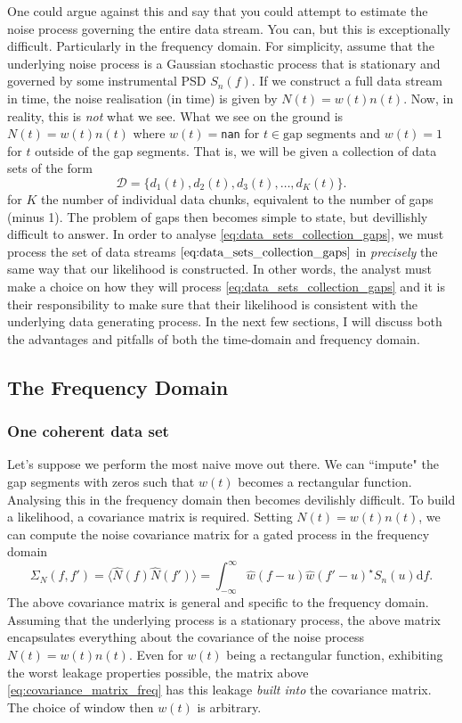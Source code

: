 \documentclass{article}
\begin{document}
One could argue against this and say that you could attempt to estimate the noise process governing the entire data stream. You can, but this is exceptionally difficult. Particularly in the frequency domain. For simplicity, assume that the underlying noise process is a Gaussian stochastic process that is stationary and governed by some instrumental PSD $S_{n}(f)$. If we construct a full data stream in time, the noise realisation (in time) is given by $N(t) = w(t)n(t)$. Now, in reality, this is \emph{not} what we see. What we see on the ground is $N(t) = w(t)n(t)$ where $w(t) =$\texttt{nan} for $t \in \text{gap segments}$ and $w(t) = 1$ for $t$ outside of the gap segments. That is, we will be given a collection of data sets of the form 
\begin{equation}\label{eq:data_sets_collection_gaps}
    \mathcal{D} = \{d_{1}(t), d_{2}(t), d_{3}(t), \ldots, d_{K}(t)\}.
\end{equation}
for $K$ the number of individual data chunks, equivalent to the number of gaps (minus 1). The problem of gaps then becomes simple to state, but devillishly difficult to answer. In order to analyse \eqref{eq:data_sets_collection_gaps}, we must process the set of data streams $\eqref{eq:data_sets_collection_gaps}$ in \emph{precisely} the same way that our likelihood is constructed. In other words, the analyst must make a choice on how they will process \eqref{eq:data_sets_collection_gaps} and it is their responsibility to make sure that their likelihood is consistent with the underlying data generating process. In the next few sections, I will discuss both the advantages and  pitfalls of both the time-domain and frequency domain.

\subsection{The Frequency Domain}
\subsubsection{One coherent data set}
Let's suppose we perform the most naive move out there. We can ``impute" the gap segments with zeros such that $w(t)$ becomes a rectangular function. Analysing this in the frequency domain then becomes devilishly difficult. To build a likelihood, a covariance matrix is required. Setting $N(t) = w(t)n(t)$, we can compute the noise covariance matrix for a gated process in the frequency domain
\begin{equation}\label{eq:covariance_matrix_freq}
\Sigma_{N}(f,f') = \langle \hat{N}(f)\hat{N}(f') \rangle = \int_{-\infty}^{\infty}\hat{w}(f - u)\hat{w}(f' - u)^{\star}S_{n}(u) \text{d}f. 
\end{equation}
The above covariance matrix is general and specific to the frequency domain. Assuming that the underlying process is a stationary process, the above matrix encapsulates everything about the covariance of the noise process $N(t) = w(t)n(t)$. Even for $w(t)$ being a rectangular function, exhibiting the worst leakage properties possible, the matrix above \eqref{eq:covariance_matrix_freq} has this leakage \emph{built into} the covariance matrix. The choice of window then $w(t)$ is arbitrary. 
\end{document}
